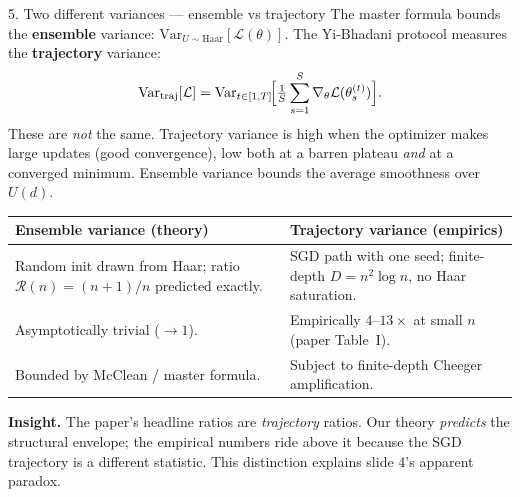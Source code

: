 \documentclass[10pt, aspectratio=169]{beamer}
\newcommand{\insight}[1]{\textbf{\textcolor{ours}{Insight.}} #1}
\begin{document}
\begin{frame}{5. Two different variances — ensemble vs trajectory}
    \scriptsize
    The master formula bounds the \textbf{ensemble} variance: $\mathrm{Var}_{U \sim \mathrm{Haar}}[\mathcal{L}(\theta)]$.
    The Yi-Bhadani protocol measures the \textbf{trajectory} variance:
    \[
        \mathrm{Var}_{\mathrm{traj}}[\mathcal{L}] = \mathrm{Var}_{t \in [1, T]}\!\Bigl[\tfrac{1}{S}\sum_{s=1}^S \nabla_\theta \mathcal{L}(\theta^{(t)}_s)\Bigr].
    \]
    These are \emph{not} the same. Trajectory variance is high when the optimizer makes large
    updates (good convergence), low both at a barren plateau \emph{and} at a converged minimum.
    Ensemble variance bounds the average smoothness over $U(d)$.

    \begin{tabular}{p{}|p{}}\toprule
    \textbf{Ensemble variance (theory)} & \textbf{Trajectory variance (empirics)} \\\midrule
    Random init drawn from Haar; ratio $\mathcal{R}(n)=(n+1)/n$ predicted exactly. & SGD path with one seed; finite-depth $D = n^2 \log n$, no Haar saturation. \\
    Asymptotically trivial ($\to 1$). & Empirically $4\text{--}13\times$ at small $n$ (paper Table~I). \\
    Bounded by McClean / master formula. & Subject to finite-depth Cheeger amplification. \\\bottomrule
    \end{tabular}

    \insight{The paper's headline ratios are \emph{trajectory} ratios. Our theory \emph{predicts}
    the structural envelope; the empirical numbers ride above it because the SGD trajectory is
    a different statistic. This distinction explains slide 4's apparent paradox.}
\end{frame}
\end{document}
